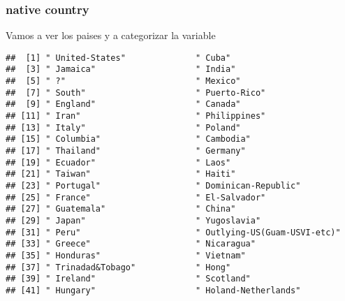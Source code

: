 \documentclass[]{article}
\newenvironment{Shaded}{\begin{snugshade}}{\end{snugshade}}
\newcommand{\DataTypeTok}[1]{\textcolor[rgb]{0.87,0.87,0.75}{#1}}
\newcommand{\FloatTok}[1]{\textcolor[rgb]{0.75,0.75,0.82}{#1}}
\newcommand{\KeywordTok}[1]{\textcolor[rgb]{0.94,0.87,0.69}{#1}}
\newcommand{\NormalTok}[1]{\textcolor[rgb]{0.80,0.80,0.80}{#1}}
\newcommand{\OperatorTok}[1]{\textcolor[rgb]{0.94,0.94,0.82}{#1}}
\newcommand{\StringTok}[1]{\textcolor[rgb]{0.80,0.58,0.58}{#1}}
\begin{document}
\hypertarget{native-country}{%
\subsubsection{native country}\label{native-country}}

Vamos a ver los paises y a categorizar la variable

\begin{Shaded}
\end{Shaded}

\begin{verbatim}
##  [1] " United-States"              " Cuba"                      
##  [3] " Jamaica"                    " India"                     
##  [5] " ?"                          " Mexico"                    
##  [7] " South"                      " Puerto-Rico"               
##  [9] " England"                    " Canada"                    
## [11] " Iran"                       " Philippines"               
## [13] " Italy"                      " Poland"                    
## [15] " Columbia"                   " Cambodia"                  
## [17] " Thailand"                   " Germany"                   
## [19] " Ecuador"                    " Laos"                      
## [21] " Taiwan"                     " Haiti"                     
## [23] " Portugal"                   " Dominican-Republic"        
## [25] " France"                     " El-Salvador"               
## [27] " Guatemala"                  " China"                     
## [29] " Japan"                      " Yugoslavia"                
## [31] " Peru"                       " Outlying-US(Guam-USVI-etc)"
## [33] " Greece"                     " Nicaragua"                 
## [35] " Honduras"                   " Vietnam"                   
## [37] " Trinadad&Tobago"            " Hong"                      
## [39] " Ireland"                    " Scotland"                  
## [41] " Hungary"                    " Holand-Netherlands"
\end{verbatim}

\begin{Shaded}
\end{Shaded}
\end{document}
